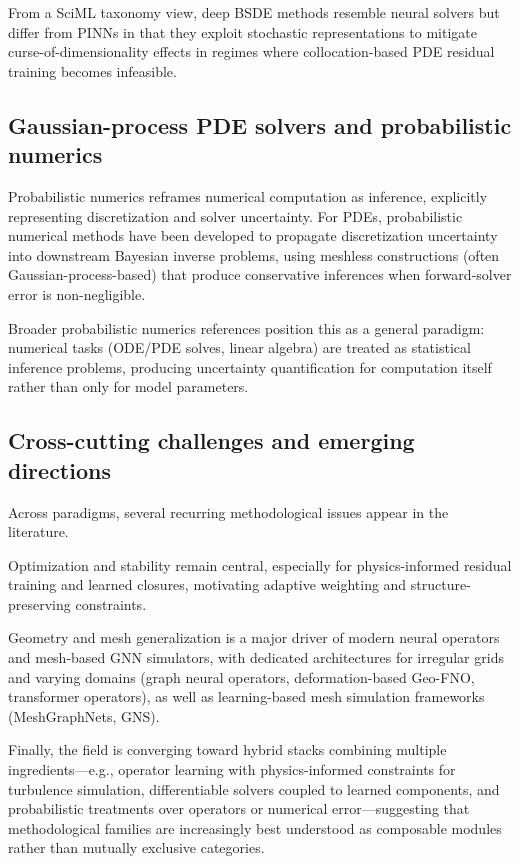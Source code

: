 \documentclass[11pt]{article}
\begin{document}
From a SciML taxonomy view, deep BSDE methods resemble neural solvers but differ from PINNs in that they exploit stochastic representations to mitigate curse-of-dimensionality effects in regimes where collocation-based PDE residual training becomes infeasible.

\subsection{Gaussian-process PDE solvers and probabilistic numerics}

Probabilistic numerics reframes numerical computation as inference, explicitly representing discretization and solver uncertainty. For PDEs, probabilistic numerical methods have been developed to propagate discretization uncertainty into downstream Bayesian inverse problems, using meshless constructions (often Gaussian-process-based) that produce conservative inferences when forward-solver error is non-negligible.

Broader probabilistic numerics references position this as a general paradigm: numerical tasks (ODE/PDE solves, linear algebra) are treated as statistical inference problems, producing uncertainty quantification for computation itself rather than only for model parameters.

\subsection{Cross-cutting challenges and emerging directions}

Across paradigms, several recurring methodological issues appear in the literature.

Optimization and stability remain central, especially for physics-informed residual training and learned closures, motivating adaptive weighting and structure-preserving constraints.

Geometry and mesh generalization is a major driver of modern neural operators and mesh-based GNN simulators, with dedicated architectures for irregular grids and varying domains (graph neural operators, deformation-based Geo-FNO, transformer operators), as well as learning-based mesh simulation frameworks (MeshGraphNets, GNS).

Finally, the field is converging toward hybrid stacks combining multiple ingredients---e.g., operator learning with physics-informed constraints for turbulence simulation, differentiable solvers coupled to learned components, and probabilistic treatments over operators or numerical error---suggesting that methodological families are increasingly best understood as composable modules rather than mutually exclusive categories.
\end{document}
